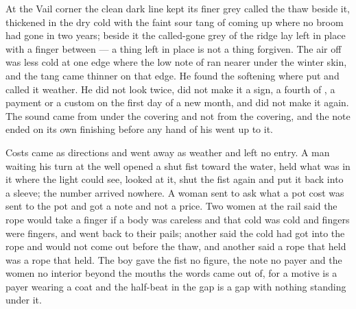 At the Vail corner the clean dark line kept its finer grey called the thaw beside it, thickened in the dry cold with the faint sour tang of  coming up where no broom had gone in two years; beside it the called-gone grey of the ridge lay left in place with a finger between --- a thing left in place is not a thing forgiven. The air off  was less cold at one edge where the low note of  ran nearer under the winter skin, and the tang came thinner on that edge. He found the softening where put and called it weather. He did not look twice, did not make it a sign, a fourth of , a payment or a custom on the first day of a new month, and did not make it again. The sound came from under the covering and not from the covering, and the note ended on its own finishing before any hand of his went up to it.

Costs came as directions and went away as weather and left no entry. A man waiting his turn at the well opened a shut fist toward the water, held what was in it where the light could see, looked at it, shut the fist again and put it back into a sleeve; the number arrived nowhere. A woman sent to ask what a pot cost was sent to the pot and got a note and not a price. Two women at the rail said the rope would take a finger if a body was careless and that cold was cold and fingers were fingers, and went back to their pails; another said the cold had got into the rope and would not come out before the thaw, and another said a rope that held was a rope that held. The boy gave the fist no figure, the note no payer and the women no interior beyond the mouths the words came out of, for a motive is a payer wearing a coat and the half-beat in the gap is a gap with nothing standing under it.

